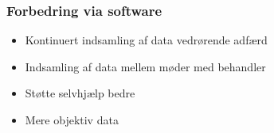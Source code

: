 \begin{frame}
\frametitle{Forbedring via software}

\begin{itemize}
\item Kontinuert indsamling af data vedrørende adfærd
\item Indsamling af data mellem møder med behandler
\item Støtte selvhjælp bedre
\item Mere objektiv data
\end{itemize}

\end{frame}
